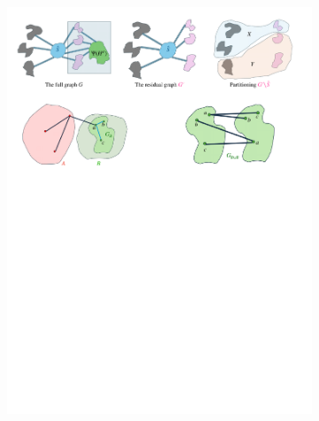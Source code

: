\documentclass[11pt]{article}
\begin{document}
\begin{figure}
    \centering
    \begin{subfigure}[t]{0.45\textwidth}
        \centering
        \includegraphics[width=\textwidth]{assets/partition-a.pdf}
        \caption{}
      \label{fig:partition}
    \end{subfigure}%
    \hspace{1mm}
    \hspace{1mm}    
    \begin{subfigure}[t]{0.45\textwidth}
        \centering

\end{subfigure}
\end{figure}
\end{document}
